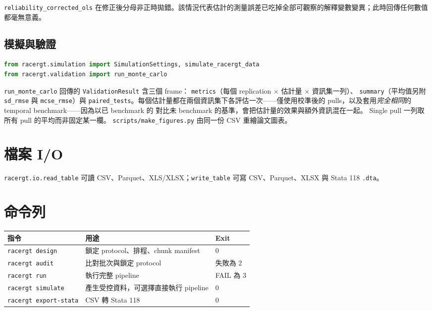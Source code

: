 \documentclass[12pt,a4paper,oneside]{article}
\begin{document}
\texttt{reliability\_corrected\_ols} 在修正後分母非正時拋錯。該情況代表估計的測量誤差已吃掉全部可觀察的解釋變數變異；此時回傳任何數值都毫無意義。

\subsection{模擬與驗證}

\begin{lstlisting}[language=Python]
from racergt.simulation import SimulationSettings, simulate_racergt_data
from racergt.validation import run_monte_carlo
\end{lstlisting}

\texttt{run\_monte\_carlo} 回傳的 \texttt{ValidationResult} 含三個 frame：
\texttt{metrics}（每個 replication $\times$ 估計量 $\times$ 資訊集一列）、
\texttt{summary}（平均值另附 \texttt{sd\_rmse} 與 \texttt{mcse\_rmse}）與
\texttt{paired\_tests}。每個估計量都在兩個資訊集下各評估一次——僅使用校準後的
pulls，以及套用\emph{完全相同}的 temporal benchmark——因為以已 benchmark 的
\RACER{} 對比未 benchmark 的基準，會把估計量的效果與額外資訊混在一起。
Single pull 一列取所有 pull 的平均而非固定某一欄。
\texttt{scripts/make\_figures.py} 由同一份 CSV 重繪論文圖表。

\section{檔案 I/O}

\texttt{racergt.io.read\_table} 可讀 CSV、Parquet、XLS/XLSX；\texttt{write\_table} 可寫 CSV、Parquet、XLSX 與 Stata 118 \texttt{.dta}。

\section{命令列}

\begin{table}[H]
\centering\small
\begin{tabularx}{\textwidth}{lXl}
\toprule
指令 & 用途 & Exit\\
\midrule
\texttt{racergt design} & 鎖定 protocol、排程、chunk manifest & 0\\
\texttt{racergt audit} & 比對批次與鎖定 protocol & 失敗為 2\\
\texttt{racergt run} & 執行完整 pipeline & FAIL 為 3\\
\texttt{racergt simulate} & 產生受控資料，可選擇直接執行 pipeline & 0\\
\texttt{racergt export-stata} & CSV 轉 Stata 118 & 0\\
\bottomrule
\end{tabularx}
\end{table}
\end{document}
